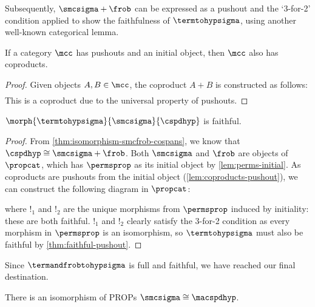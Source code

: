Subsequently, \(\smcsigma + \frob\) can be expressed as a pushout and the
`3-for-2' condition applied to show the faithfulness of \(\termtohypsigma\),
using another well-known categorical lemma.

\begin{lemma}\label{lem:coproducts-pushout}
    If a category \(\mcc\) has pushouts and an initial object, then \(\mcc\)
    also has coproducts.
\end{lemma}
\begin{proof}
    Given objects \(A,B \in \mcc\), the coproduct \(A + B\) is constructed as
    follows:
    \begin{gather*}
    \end{gather*}
    This is a coproduct due to the universal property of pushouts.
\end{proof}

\begin{proposition}
    \(\morph{\termtohypsigma}{\smcsigma}{\cspdhyp}\) is faithful.
\end{proposition}
\begin{proof}
    From \cref{thm:isomorphism-smcfrob-cospans}, we know that
    \(\cspdhyp \cong \smcsigma + \frob\).
    Both \(\smcsigma\) and \(\frob\) are objects of \(\propcat\), which has
    \(\permsprop\) as its initial object by \cref{lem:perms-initial}.
    As coproducts are pushouts from the initial object
    (\cref{lem:coproducts-pushout}), we can construct the following diagram in
    \(\propcat\):
    \begin{center}
        
    \end{center}
    where \(!_1\) and \(!_2\) are the unique morphisms from
    \(\permsprop\) induced by initiality: these are both faithful.
    \(!_1\) and \(!_2\) clearly satisfy the 3-for-2 condition as every morphism
    in \(\permsprop\) is an isomorphism, so \(\termtohypsigma\) must also
    be faithful by \cref{thm:faithful-pushout}.
\end{proof}

Since \(\termandfrobtohypsigma\) is full and faithful, we have reached our
final destination.

\begin{corollary}
    There is an isomorphism of PROPs \(\smcsigma \cong \macspdhyp\).
\end{corollary}

